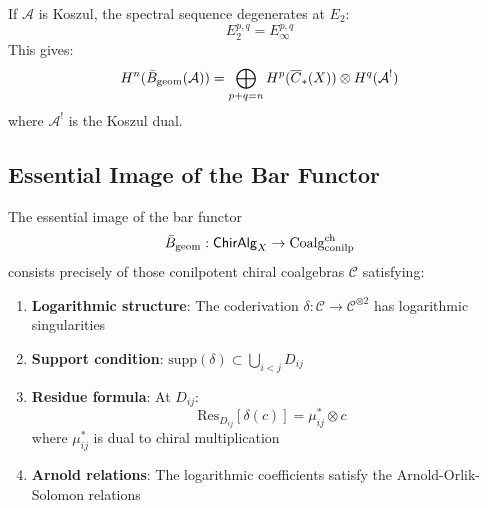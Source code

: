 \begin{corollary}[Degeneration]
If $\mathcal{A}$ is Koszul, the spectral sequence degenerates at $E_2$:
$$E_2^{p,q} = E_\infty^{p,q}$$
This gives:
$$H^n(\bar{B}_{\text{geom}}(\mathcal{A})) = \bigoplus_{p+q=n} H^p(\overline{C}_{*}(X)) \otimes H^q(\mathcal{A}^!)$$
where $\mathcal{A}^!$ is the Koszul dual.
\end{corollary}

\subsection{Essential Image of the Bar Functor}

\begin{theorem}
The essential image of the bar functor 
$$\bar{B}_{\text{geom}}: \mathsf{ChirAlg}_X \to \text{Coalg}_{\text{conilp}}^{\text{ch}}$$
consists precisely of those conilpotent chiral coalgebras $\mathcal{C}$ satisfying:
\begin{enumerate}
\item \textbf{Logarithmic structure}: The coderivation $\delta: \mathcal{C} \to \mathcal{C}^{\otimes 2}$ has logarithmic singularities
\item \textbf{Support condition}: $\text{supp}(\delta) \subset \bigcup_{i<j} D_{ij}$
\item \textbf{Residue formula}: At $D_{ij}$:
$$\text{Res}_{D_{ij}}[\delta(c)] = \mu_{ij}^* \otimes c$$
where $\mu_{ij}^*$ is dual to chiral multiplication
\item \textbf{Arnold relations}: The logarithmic coefficients satisfy the Arnold-Orlik-Solomon relations
\end{enumerate}
\end{theorem}

